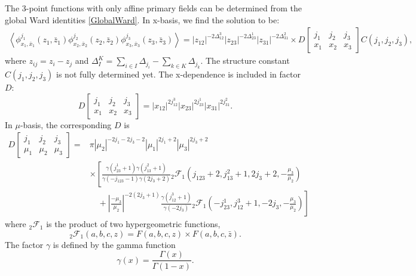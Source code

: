 \documentclass[10pt,a4paper]{article}
\numberwithin{equation}{section}
\newcommand{\vev}[1]{\left\langle #1 \right\rangle}
\begin{document}
The 3-point functions with only affine primary fields can be determined from the global Ward identities \ref{GlobalWard}. 
In x-basis, we find the solution to be:
\begin{equation}
    \begin{aligned}
            \vev{\phi^{j_{1}}_{x_{1},\bar{x}_{1}}(z_{1},\bar{z}_{1}) \phi^{j_{2}}_{x_{2},\bar{x}_{2}}(z_{2},\bar{z}_{2}) \phi^{j_{3}}_{x_{3},\bar{x}_{3}}(z_{3},\bar{z}_{3})} =
            |z_{12}|^{-2 \Delta_{12}^{3}} |z_{23}|^{-2 \Delta_{23}^{1}} |z_{31}|^{-2 \Delta_{31}^{2}}
                 \times D \left[\begin{array}{ccc}
    j_{1} & j_{2} & j_{3} \\
    x_{1} & x_{2} & x_{3}
    \end{array} \right] C(j_{1},j_{2},j_{3}),
    \end{aligned} \label{3pointfuncx}
\end{equation}
where $z_{ij} = z_{i} - z_{j}$ and $\Delta^{K}_{I} = \sum_{i \in I} \Delta_{j_{i}} - \sum_{k \in K} \Delta_{j_{k}}$. The structure constant 
$C(j_{1},j_{2},j_{3})$ is not fully determined yet. The x-dependence is included in factor $D$:
\begin{equation}
    D \left[\begin{array}{ccc}
    j_{1} & j_{2} & j_{3} \\
    x_{1} & x_{2} & x_{3}
    \end{array} \right] = |x_{12}|^{2 j_{12}^{3}} |x_{23}|^{2 j_{23}^{1}} |x_{31}|^{2 j_{31}^{2}}.
\end{equation}
In $\mu$-basis, the corresponding $D$ is 
\begin{equation}
    \begin{aligned}
        D \left[\begin{array}{ccc}
        j_{1} & j_{2} & j_{3} \\
        \mu_{1} & \mu_{2} & \mu_{3}
        \end{array} \right] = & \pi |\mu_{2}|^{-2 j_{1} - 2 j_{3} - 2} |\mu_{1}|^{2j_{1} + 2} |\mu_{3}|^{2j_{3} + 2} \\
                            & \times \left[\frac{\gamma(j_{23}^{1} + 1) \gamma(j_{13}^{2} + 1)}{\gamma(-j_{123}-1) \gamma(2j_{3}+2)} {}_{2} \mathcal{F}_{1} (j_{123} +2, j_{13}^{2} +1, 2j_{3} + 2, -\frac{\mu_{3}}{\mu_{2}}) \right.\\
                            &\quad + \left. \left| \frac{-\mu_{3}}{\mu_{2}}\right|^{-2(2j_{3}+1)} \frac{\gamma(j_{12}^{3} + 1)}{\gamma(-2 j_{3})} {}_{2} \mathcal{F}_{1} (-j_{23}^{1}, j_{12}^{3} +1, -2j_{3}, -\frac{\mu_{3}}{\mu_{2}}) \right]
    \end{aligned}
\end{equation}
where ${}_{2} \mathcal{F}_{1}$ is the product of two hypergeometric functions, 
\begin{equation}
    {}_{2}\mathcal{F}_{1}(a,b,c,z) = F(a,b,c,z) \times F(a,b,c,\bar{z}).
\end{equation}
The factor $\gamma$ is defined by the gamma function 
\begin{equation}
    \gamma(x) = \frac{\Gamma(x)}{\Gamma(1-x)}.
\end{equation}
\end{document}
